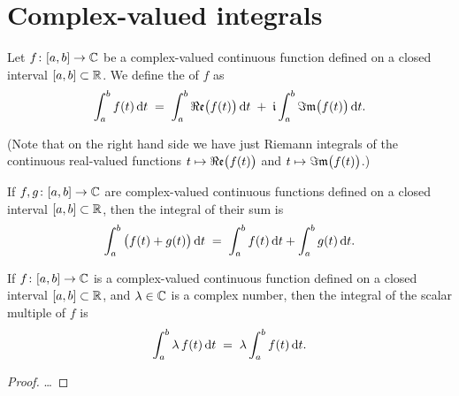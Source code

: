 \section{Complex-valued integrals}

\begin{definition}
  \label{def:complex_valued_integral}
  Let $f \colon [a,b] \to \mathbb{C}$ be a complex-valued continuous function
  defined on a closed interval $[a,b] \subset \mathbb{R}$. We define the
   of $f$ as
  \begin{align*}
    \int_a^b f(t) \, \mathrm{d} t
      \; = \; \int_a^b \Re\mathfrak{e} \big( f(t) \big) \, \mathrm{d} t
              \; + \; \mathfrak{i} \int_a^b \Im\mathfrak{m} \big( f(t) \big) \, \mathrm{d} t .
  \end{align*}

  (Note that on the right hand side we have just Riemann integrals
  of the continuous real-valued functions $t \mapsto \Re\mathfrak{e} \big( f(t) \big)$
  and $t \mapsto \Im\mathfrak{m} \big( f(t) \big)$.)
\end{definition}

\begin{lemma}
  \label{lem:linearity_of_complex_integral}
  If $f, g \colon [a,b] \to \mathbb{C}$ are complex-valued continuous
  functions defined on a closed interval $[a,b] \subset \mathbb{R}$,
  then the integral of their sum is
  \begin{align*}
    \int_a^b \big( f(t) + g(t) \big) \, \mathrm{d} t
      \; = \; \int_a^b f(t) \, \mathrm{d} t + \int_a^b g(t) \, \mathrm{d} t .
  \end{align*}

  If $f \colon [a,b] \to \mathbb{C}$ is a complex-valued continuous
  function defined on a closed interval $[a,b] \subset \mathbb{R}$,
  and $\lambda \in \mathbb{C}$ is a complex number, then the integral of
  the scalar multiple of $f$ is
  \begin{align*}
    \int_a^b \lambda \, f(t) \, \mathrm{d} t
      \; = \; \lambda \int_a^b f(t) \, \mathrm{d} t .
  \end{align*}
\end{lemma}
\begin{proof}
  \ldots
\end{proof}


